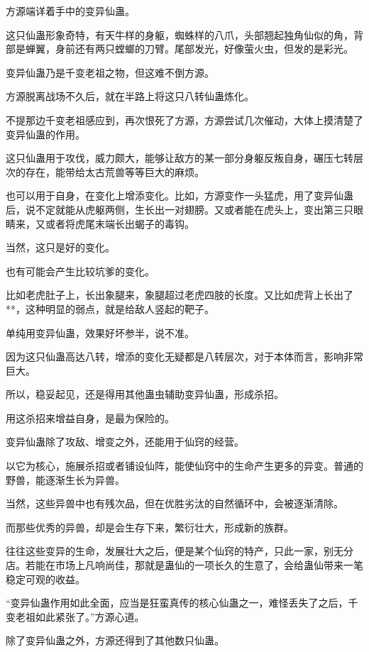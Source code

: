 
\begin{this_body}

方源端详着手中的变异仙蛊。

这只仙蛊形象奇特，有天牛样的身躯，蜘蛛样的八爪，头部翘起独角仙似的角，背部是蝉翼，身前还有两只螳螂的刀臂。尾部发光，好像萤火虫，但发的是彩光。

变异仙蛊乃是千变老祖之物，但这难不倒方源。

方源脱离战场不久后，就在半路上将这只八转仙蛊炼化。

不提那边千变老祖感应到，再次恨死了方源，方源尝试几次催动，大体上摸清楚了变异仙蛊的作用。

这只仙蛊用于攻伐，威力颇大，能够让敌方的某一部分身躯反叛自身，碾压七转层次的存在，能带给太古荒兽等等巨大的麻烦。

也可以用于自身，在变化上增添变化。比如，方源变作一头猛虎，用了变异仙蛊后，说不定就能从虎躯两侧，生长出一对翅膀。又或者能在虎头上，变出第三只眼睛来，又或者将虎尾末端长出蝎子的毒钩。

当然，这只是好的变化。

也有可能会产生比较坑爹的变化。

比如老虎肚子上，长出象腿来，象腿超过老虎四肢的长度。又比如虎背上长出了**，这种明显的弱点，就是给敌人竖起的靶子。

单纯用变异仙蛊，效果好坏参半，说不准。

因为这只仙蛊高达八转，增添的变化无疑都是八转层次，对于本体而言，影响非常巨大。

所以，稳妥起见，还是得用其他蛊虫辅助变异仙蛊，形成杀招。

用这杀招来增益自身，是最为保险的。

变异仙蛊除了攻敌、增变之外，还能用于仙窍的经营。

以它为核心，施展杀招或者铺设仙阵，能使仙窍中的生命产生更多的异变。普通的野兽，能逐渐生长为异兽。

当然，这些异兽中也有残次品，但在优胜劣汰的自然循环中，会被逐渐清除。

而那些优秀的异兽，却是会生存下来，繁衍壮大，形成新的族群。

往往这些变异的生命，发展壮大之后，便是某个仙窍的特产，只此一家，别无分店。若能在市场上凡响尚佳，那就是蛊仙的一项长久的生意了，会给蛊仙带来一笔稳定可观的收益。

“变异仙蛊作用如此全面，应当是狂蛮真传的核心仙蛊之一，难怪丢失了之后，千变老祖如此紧张了。”方源心道。

除了变异仙蛊之外，方源还得到了其他数只仙蛊。


\end{this_body}
